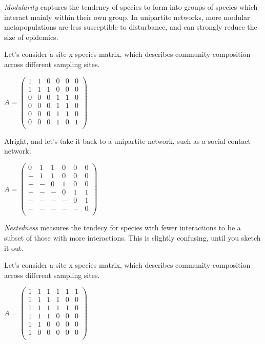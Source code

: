 \documentclass[12pt]{article}
\begin{document}
\textit{Modularity} captures the tendency of species to form into groups of species which interact mainly within their own group. In unipartite networks, more modular metapopulations are less susceptible to disturbance, and can strongly reduce the size of epidemics. 

Let's consider a site x species matrix, which describes community composition across different sampling sites.

$A = \begin{pmatrix}
    1&1&0&0&0&0\\
    1&1&1&0&0&0\\
    0&0&0&1&1&0\\
    0&0&0&1&1&0\\
    0&0&0&1&1&0\\
    0&0&0&1&0&1\\
\end{pmatrix}$




Alright, and let's take it back to a unipartite network, such as a social contact network.

$A = \begin{pmatrix}
    0&1&1&0&0&0\\
    -&1&1&0&0&0\\
    -&-&0&1&0&0\\
    -&-&-&0&1&1\\
    -&-&-&-&0&1\\
    -&-&-&-&-&0\\
\end{pmatrix}$








\textit{Nestedness} measures the tendecy for species with fewer interactions to be a subset of those with more interactions. This is slightly confusing, until you sketch it out. 


Let's consider a site x species matrix, which describes community composition across different sampling sites.

$A = \begin{pmatrix}
    1&1&1&1&1&1\\
    1&1&1&1&0&0\\
    1&1&1&1&1&0\\
    1&1&1&0&0&0\\
    1&1&0&0&0&0\\
    1&0&0&0&0&0\\
\end{pmatrix}$
\end{document}
